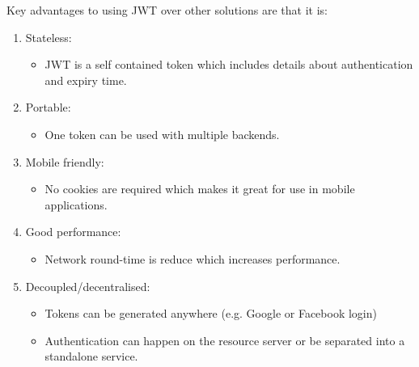 Key advantages to using JWT \cite{raju2017jwt} over other solutions are that it is:
\begin{enumerate}
    \item Stateless:
    \begin{itemize}
        \item JWT is a self contained token which includes details about authentication and expiry time.
    \end{itemize}
    \item Portable:
    \begin{itemize}
        \item One token can be used with multiple backends.
    \end{itemize}
    \item Mobile friendly:
    \begin{itemize}
        \item No cookies are required which makes it great for use in mobile applications.
    \end{itemize} 
    \item Good performance:
    \begin{itemize}
        \item Network round-time is reduce which increases performance.
    \end{itemize} 
    \item Decoupled/decentralised:
    \begin{itemize}
        \item Tokens can be generated anywhere (e.g. Google or Facebook login)
        \item Authentication can happen on the resource server or be separated into a standalone service.
    \end{itemize} 
\end{enumerate}